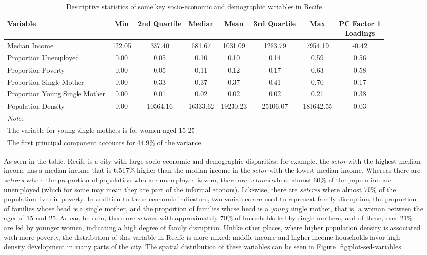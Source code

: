 \documentclass[smallextended]{svjour3}       %
\begin{document}
\begin{table}

\caption{\label{tab:table-sed-descriptive-statistics}\label{tab:sed-descriptive-statistics}Descriptive statistics of some key socio-economic and demographic variables in Recife}
\centering
\begin{tabular}[t]{lccccccc}
\toprule
Variable & Min & 2nd Quartile & Median & Mean & 3rd Quartile & Max & \makecell[l]{PC Factor 1\\ Loadings}\\
\midrule
Median Income & 122.05 & 337.40 & 581.67 & 1031.09 & 1283.79 & 7954.19 & -0.42\\
Proportion Unemployed & 0.00 & 0.05 & 0.10 & 0.10 & 0.14 & 0.59 & 0.56\\
Proportion Poverty & 0.00 & 0.05 & 0.11 & 0.12 & 0.17 & 0.63 & 0.58\\
Proportion Single Mother & 0.00 & 0.33 & 0.37 & 0.37 & 0.41 & 0.70 & 0.17\\
Proportion Young Single Mother & 0.00 & 0.01 & 0.02 & 0.02 & 0.02 & 0.21 & 0.38\\
\addlinespace
Population Density & 0.00 & 10564.16 & 16333.62 & 19230.23 & 25106.07 & 181642.55 & 0.03\\
\bottomrule
\multicolumn{8}{l}{\textit{Note: }}\\
\multicolumn{8}{l}{The variable for young single mothers is for women aged 15-25}\\
\multicolumn{8}{l}{The first principal component accounts for 44.9\% of the variance}\\
\end{tabular}
\end{table}

As seen in the table, Recife is a city with large socio-economic and
demographic disparities; for example, the \emph{setor} with the highest
median income has a median income that is 6,517\% higher than the median
income in the \emph{setor} with the lowest median income. Whereas there
are \emph{setores} where the proportion of population who are unemployed
is zero, there are \emph{setores} where almost 60\% of the population
are unemployed (which for some may mean they are part of the informal
econom). Likewise, there are \emph{setores} where almost 70\% of the
population lives in poverty. In addition to these economic indicators,
two variables are used to represent family disruption, the proportion of
families whose head is a single mother, and the proportion of families
whose head is a \emph{young} single mother, that is, a woman between the
ages of 15 and 25. As can be seen, there are \emph{setores} with
approximately 70\% of households led by single mothers, and of these,
over 21\% are led by younger women, indicating a high degree of family
disruption. Unlike other places, where higher population density is
associated with more poverty, the distribution of this variable in
Recife is more mixed: middle income and higher income households favor
high density development in many parts of the city. The spatial
distribution of these variables can be seen in Figure
\ref{fig:plot-sed-variables}.
\end{document}
